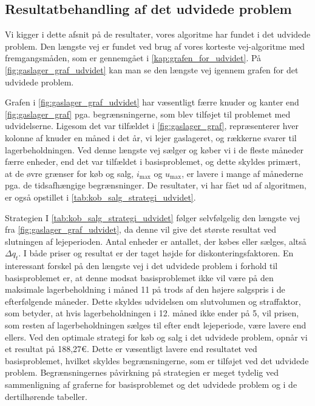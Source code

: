 \subsection{Resultatbehandling af det udvidede problem} \label{kap:resultat_udvidet}

Vi kigger i dette afsnit på de resultater, vores algoritme har fundet i det udvidede problem. Den længste vej er fundet ved brug af vores korteste vej-algoritme med fremgangsmåden, som er gennemgået i \autoref{kap:grafen_for_udvidet}. På \autoref{fig:gaslager_graf_udvidet} kan man se den længste vej igennem grafen for det udvidede problem.

Grafen i \autoref{fig:gaslager_graf_udvidet} har væsentligt færre knuder og kanter end \autoref{fig:gaslager_graf} pga. begrænsningerne, som blev tilføjet til problemet med udvidelserne. Ligesom det var tilfældet i \autoref{fig:gaslager_graf}, repræsenterer hver kolonne af knuder en måned i det år, vi lejer gaslageret, og rækkerne svarer til lagerbeholdningen. Ved denne længste vej sælger og køber vi i de fleste måneder færre enheder, end det var tilfældet i basisproblemet, og dette skyldes primært, at de øvre grænser for køb og salg, $i_{\max}$ og $u_{\max}$, er lavere i mange af månederne pga. de tidsafhængige begrænsninger. De resultater, vi har fået ud af algoritmen, er også opstillet i \autoref{tab:kob_salg_strategi_udvidet}. 

Strategien I \autoref{tab:kob_salg_strategi_udvidet} følger selvfølgelig den længste vej fra \autoref{fig:gaslager_graf_udvidet}, da denne vil give det største resultat ved slutningen af lejeperioden. Antal enheder er antallet, der købes eller sælges, altså $\Delta q_t$. I både priser og resultat er der taget højde for diskonteringsfaktoren. En interessant forskel på den længste vej i det udvidede problem i forhold til basisproblemet er, at denne modsat basisproblemet ikke vil være på den maksimale lagerbeholdning i måned 11 på trods af den højere salgspris i de efterfølgende måneder. Dette skyldes udvidelsen om slutvolumen og straffaktor, som betyder, at hvis lagerbeholdningen i 12. måned ikke ender på 5, vil prisen, som resten af lagerbeholdningen sælges til efter endt lejeperiode, være lavere end ellers. 
Ved den optimale strategi for køb og salg i det udvidede problem, opnår vi et resultat på 188,27€. Dette er væsentligt lavere end resultatet ved basisproblemet, hvilket skyldes begrænsningerne, som er tilføjet ved det udvidede problem. Begrænsningernes påvirkning på strategien er meget tydelig ved sammenligning af graferne for basisproblemet og det udvidede problem og i de dertilhørende tabeller. 
